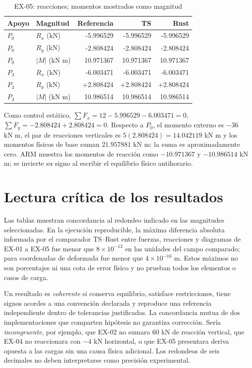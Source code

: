 \documentclass[11pt,a4paper]{article}
\begin{document}
\begin{table}[H]\centering
\caption{EX-05: reacciones; momentos mostrados como magnitud}
\begin{tabular}{@{}llrrr@{}}\toprule
Apoyo & Magnitud & Referencia & TS & Rust\\\midrule
$P_0$ & $R_x$ (kN) & -5.996529 & -5.996529 & -5.996529\\
$P_0$ & $R_y$ (kN) & -2.808424 & -2.808424 & -2.808424\\
$P_0$ & $|M|$ (kN m) & 10.971367 & 10.971367 & 10.971367\\
$P_3$ & $R_x$ (kN) & -6.003471 & -6.003471 & -6.003471\\
$P_3$ & $R_y$ (kN) & +2.808424 & +2.808424 & +2.808424\\
$P_3$ & $|M|$ (kN m) & 10.986514 & 10.986514 & 10.986514\\
\bottomrule\end{tabular}
\end{table}
Como control estático, $\sum F_x=12-5.996529-6.003471=0$,
$\sum F_y=-2.808424+2.808424=0$.
Respecto a $P_0$, el momento externo es $-36$ kN m, el par de
reacciones verticales es $5(2.808424)=14.042119$ kN m y los
momentos físicos de base suman $21.957881$ kN m:
la suma es aproximadamente cero. ARM muestra los momentos de
reacción como $-10.971367$ y $-10.986514$ kN m; se invierte su signo
al escribir el equilibrio físico antihorario.

\section{Lectura crítica de los resultados}
Las tablas muestran concordancia al redondeo indicado en las magnitudes
seleccionadas. En la ejecución reproducible, la máxima diferencia absoluta
informada por el comparador TS--Rust entre fuerzas, reacciones y diagramas
de EX-01 a EX-05 fue menor que $8\times10^{-13}$ en las unidades del campo
comparado; para coordenadas de deformada fue menor que
$4\times10^{-16}$ m. Estos máximos no son porcentajes ni una cota de error
físico y no prueban todos los elementos o casos de carga.

Un resultado es \emph{coherente} si conserva equilibrio, satisface
restricciones, tiene signos acordes a una convención declarada y reproduce
una referencia independiente dentro de tolerancias justificadas. La
concordancia mutua de dos implementaciones que comparten hipótesis no
garantiza corrección. Sería \emph{incongruente}, por ejemplo, que EX-02 no
sumara $60$ kN de reacción vertical, que EX-04 no reaccionara con $-4$ kN
horizontal, o que EX-05 presentara deriva opuesta a las cargas sin una causa
física adicional. Los redondeos de seis decimales no deben interpretarse
como precisión experimental.
\end{document}
